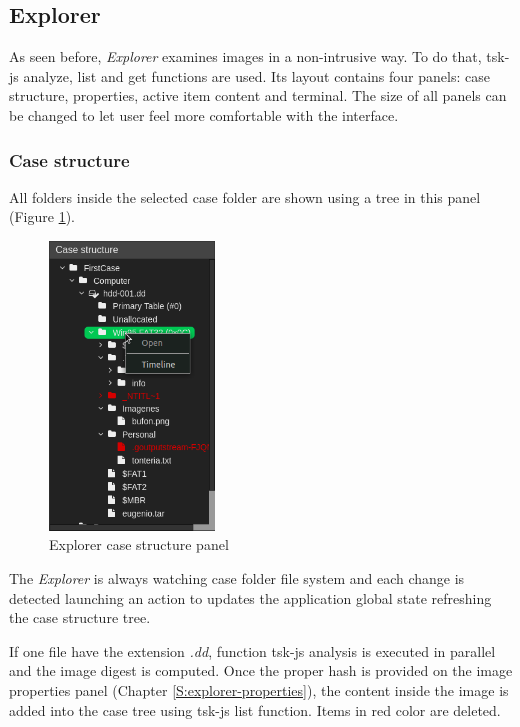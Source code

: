 \subsection{Explorer}

As seen before, \textit{Explorer} examines images in a non-intrusive way. To do
that, tsk-js analyze, list and get functions are used. Its layout contains four
panels: case structure, properties, active item content and terminal. The size
of all panels can be changed to let user feel more comfortable with the 
interface.

\subsubsection{Case structure}
\label{S:case-structure}

All folders inside the selected case folder are shown using a tree in this 
panel (Figure \ref{F:img-spy-explorer-case-structure}).

\begin{figure}
	\includegraphics[width=4.4cm]{./figures/explorer-case-structure.png}
	\centering
	\caption{Explorer case structure panel}
	\label{F:img-spy-explorer-case-structure}
\end{figure}

The \textit{Explorer} is always watching case folder file system and each
change is detected launching an action to updates the application global state
refreshing the case structure tree. 

If one file have the extension \textit{.dd}, function tsk-js analysis is
executed in parallel and the image digest is computed. Once the proper hash is
provided on the image properties panel (Chapter \ref{S:explorer-properties}),
the content inside the image is added into the case tree using tsk-js list
function. Items in red color are deleted.

